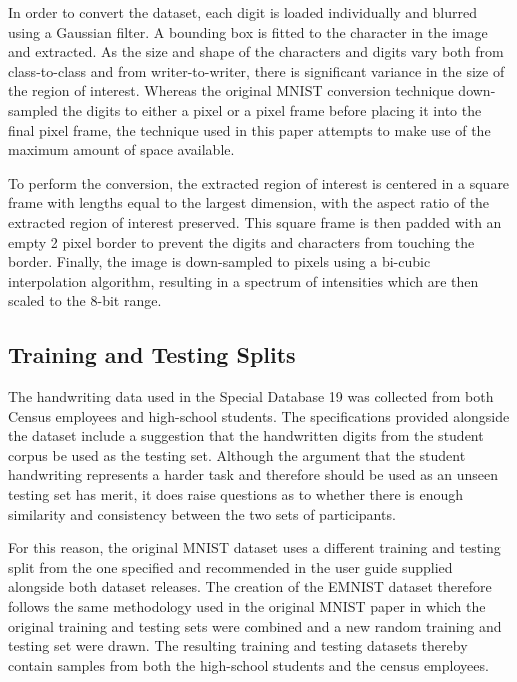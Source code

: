 \documentclass[conference]{IEEEtran}
\begin{document}
In order to convert the dataset, each digit is loaded individually and blurred using a Gaussian filter. A bounding box is fitted to the character in the image and extracted. As the size and shape of the characters and digits vary both from class-to-class and from writer-to-writer, there is significant variance in the size of the region of interest. Whereas the original MNIST conversion technique down-sampled the digits to either a  pixel or a  pixel frame before placing it into the final  pixel frame, the technique used in this paper attempts to make use of the maximum amount of space available. 

To perform the conversion, the extracted region of interest is centered in a square frame with lengths equal to the largest dimension, with the aspect ratio of the extracted region of interest preserved. This square frame is then padded with an empty 2 pixel border to prevent the digits and characters from touching the border. Finally, the image is down-sampled to  pixels using a bi-cubic interpolation algorithm, resulting in a spectrum of intensities which are then scaled to the 8-bit range. 

\subsection{Training and Testing Splits}
\label{sec:methodology-splits}

The handwriting data used in the Special Database 19 was collected from both Census employees and high-school students. The specifications provided alongside the dataset include a suggestion that the handwritten digits from the student corpus be used as the testing set. Although the argument that the student handwriting represents a harder task and therefore should be used as an unseen testing set has merit, it does raise questions as to whether there is enough similarity and consistency between the two sets of participants. 

For this reason, the original MNIST dataset uses a different training and testing split from the one specified and recommended in the user guide supplied alongside both dataset releases. The creation of the EMNIST dataset therefore follows the same methodology used in the original MNIST paper \cite{LeCun1998} in which the original training and testing sets were combined and a new random training and testing set were drawn. The resulting training and testing datasets thereby contain samples from both the high-school students and the census employees.
\end{document}
